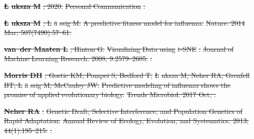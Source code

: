 \documentclass[9pt,lineno]{elife} %
\providecommand{\DIFdel}[1]{{\protect\color{red}\sout{#1}}}                      %
\providecommand{\DIFdeltex}[1]{{\protect\color{red}\sout{#1}}}                      %
\providecommand{\DIFdel}[1]{\texorpdfstring{\DIFdeltex{#1}}{}} %
\begin{document}
\textbf{%
\DIFdel{\L}%
\DIFdel{uksza M}}%
\DIFdel{; 2020.
}%
\DIFdel{Personal Communication}%
\DIFdel{.
}%

\textbf{%
\DIFdel{\L}%
\DIFdel{uksza M}}%
\DIFdel{, L}%
\DIFdel{\"a}%
\DIFdel{ssig M.
}%
\DIFdel{A predictive fitness model for influenza.}%
\DIFdel{Nature.  2014 Mar; 507(7490):57--61.
}%

\textbf{%
\DIFdel{van~der Maaten L}}%
\DIFdel{, Hinton G.
}%
\DIFdel{Visualizing Data using }%
\DIFdel{t-SNE}%
\DIFdel{.
}%
\DIFdel{Journal of Machine Learning Research.  2008; 9:2579--2605.
}%
\DIFdel{.
}%

\textbf{%
\DIFdel{Morris DH}}%
\DIFdel{, Gostic KM, Pompei S, Bedford T,
  }%
\DIFdel{\L}%
\DIFdel{uksza M, Neher RA, Grenfell BT, L}%
\DIFdel{\"a}%
\DIFdel{ssig M, McCauley JW.
}%
\DIFdel{Predictive modeling of influenza shows the promise of applied
  evolutionary biology.}%
\DIFdel{Trends Microbiol.  2017 Oct; .
}%

\textbf{%
\DIFdel{Neher RA}}%
\DIFdel{.
}%
\DIFdel{Genetic Draft, Selective Interference, and Population Genetics of
  Rapid Adaptation.
}%
\DIFdel{Annual Review of Ecology, Evolution, and Systematics.  2013;
  44(1):195--215.
}%
\DIFdel{.
}%
\end{document}
